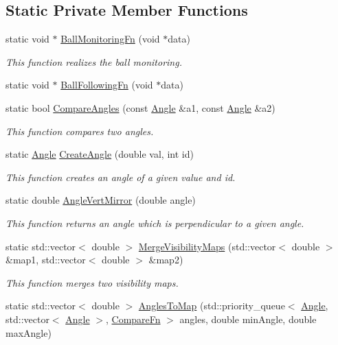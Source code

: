 \subsection*{Static Private Member Functions}
\begin{DoxyCompactItemize}
\item 
static void $\ast$ \hyperlink{classBallMonitor_af76da8bc13e92d9083a9a77469c472df}{BallMonitoringFn} (void $\ast$data)
\begin{DoxyCompactList}\small\item\em This function realizes the ball monitoring. \item\end{DoxyCompactList}\item 
static void $\ast$ \hyperlink{classBallMonitor_a2ca3e25f437b5aabb3bc88e0f84cf9a5}{BallFollowingFn} (void $\ast$data)
\item 
static bool \hyperlink{classBallMonitor_a78114ec7fc20317f84491e428dd8c126}{CompareAngles} (const \hyperlink{structBallMonitor_1_1Angle}{Angle} \&a1, const \hyperlink{structBallMonitor_1_1Angle}{Angle} \&a2)
\begin{DoxyCompactList}\small\item\em This function compares two angles. \item\end{DoxyCompactList}\item 
static \hyperlink{structBallMonitor_1_1Angle}{Angle} \hyperlink{classBallMonitor_a805b7229e7db773c56e9987d794ada9a}{CreateAngle} (double val, int id)
\begin{DoxyCompactList}\small\item\em This function creates an angle of a given value and id. \item\end{DoxyCompactList}\item 
static double \hyperlink{classBallMonitor_a32d7b6d877b84c7d7fd9bc9ffe659562}{AngleVertMirror} (double angle)
\begin{DoxyCompactList}\small\item\em This function returns an angle which is perpendicular to a given angle. \item\end{DoxyCompactList}\item 
static std::vector$<$ double $>$ \hyperlink{classBallMonitor_a74f8a1ce881528e475269fa1c964fa61}{MergeVisibilityMaps} (std::vector$<$ double $>$ \&map1, std::vector$<$ double $>$ \&map2)
\begin{DoxyCompactList}\small\item\em This function merges two visibility maps. \item\end{DoxyCompactList}\item 
static std::vector$<$ double $>$ \hyperlink{classBallMonitor_a8f3198b6b4ef8eb52c0ff04afd33cc8f}{AnglesToMap} (std::priority\_\-queue$<$ \hyperlink{structBallMonitor_1_1Angle}{Angle}, std::vector$<$ \hyperlink{structBallMonitor_1_1Angle}{Angle} $>$, \hyperlink{classBallMonitor_a5ad781c99d5b43bee7c838de9da75527}{CompareFn} $>$ angles, double minAngle, double maxAngle)
\end{DoxyCompactItemize}
